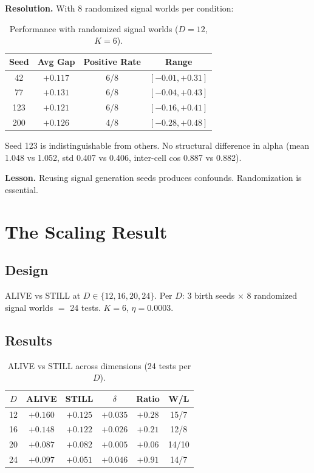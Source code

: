 \documentclass[11pt,a4paper]{article}
\begin{document}
\textbf{Resolution.} With 8 randomized signal worlds per condition:

\begin{table}[h]
\centering
\caption{Performance with randomized signal worlds ($D{=}12$, $K{=}6$).}
\label{tab:confound}
\begin{tabular}{cccc}
\toprule
Seed & Avg Gap & Positive Rate & Range \\
\midrule
42 & $+0.117$ & 6/8 & $[-0.01, +0.31]$ \\
77 & $+0.131$ & 6/8 & $[-0.04, +0.43]$ \\
123 & $+0.121$ & 6/8 & $[-0.16, +0.41]$ \\
200 & $+0.126$ & 4/8 & $[-0.28, +0.48]$ \\
\bottomrule
\end{tabular}
\end{table}

Seed 123 is indistinguishable from others. No structural difference in alpha (mean 1.048 vs 1.052, std 0.407 vs 0.406, inter-cell cos 0.887 vs 0.882).

\textbf{Lesson.} Reusing signal generation seeds produces confounds. Randomization is essential.

\section{The Scaling Result}
\label{sec:scaling}

\subsection{Design}

ALIVE vs STILL at $D \in \{12, 16, 20, 24\}$. Per $D$: 3 birth seeds $\times$ 8 randomized signal worlds $=$ 24 tests. $K{=}6$, $\eta{=}0.0003$.

\subsection{Results}

\begin{table}[h]
\centering
\caption{ALIVE vs STILL across dimensions (24 tests per $D$).}
\label{tab:scaling}
\begin{tabular}{cccccc}
\toprule
$D$ & ALIVE & STILL & $\delta$ & Ratio & W/L \\
\midrule
12 & $+0.160$ & $+0.125$ & $+0.035$ & $+0.28$ & 15/7 \\
16 & $+0.148$ & $+0.122$ & $+0.026$ & $+0.21$ & 12/8 \\
20 & $+0.087$ & $+0.082$ & $+0.005$ & $+0.06$ & 14/10 \\
24 & $+0.097$ & $+0.051$ & $+0.046$ & $+0.91$ & 14/7 \\
\bottomrule
\end{tabular}
\end{table}
\end{document}
